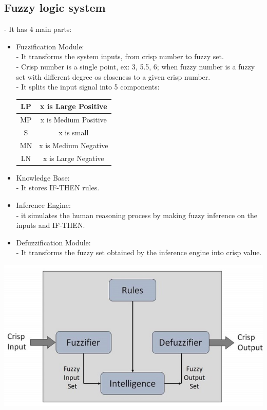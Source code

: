 \documentclass[12pt]{article}
\begin{document}
\subsection{Fuzzy logic system}
- It has 4 main parts: \\
\begin{itemize}
	\item Fuzzification Module: \\
	- It transforms the system inputs, from  crisp number to fuzzy set. \\
	- Crisp number is a single point, ex: 3, 5.5, 6; when fuzzy number is a fuzzy set with different degree os closeness to a given crisp number. \\
	- It splits the input signal into 5 components: \\
	\begin{tabular}{|c|c|}
	\hline
	LP & x is Large Positive \\
	\hline
	MP & x is Medium Positive \\
	\hline
	S & x is small \\
	\hline
	MN & x is Medium Negative \\
	\hline
	LN & x is Large Negative \\
	\hline
	\end{tabular}
	\bigbreak
	\item Knowledge Base: \\
	- It stores IF-THEN rules.
	\item Inference Engine: \\
	- it simulates the human reasoning process by making fuzzy inference on the inputs and IF-THEN.
	\item Defuzzification Module: \\
	- It transforms the fuzzy set obtained by the inference engine into crisp value.
\end{itemize}
\includegraphics[scale = 0.8]{hinh16}
\bigbreak
\end{document}
